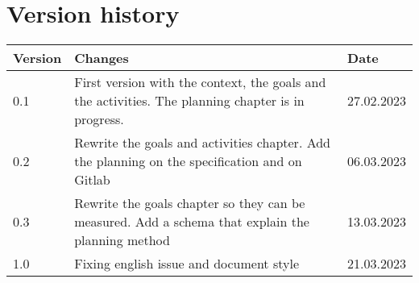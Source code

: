\chapter{Version history}
\label{chap:spec-versions}

\begin{tabular}{|m{}|m{}|m{}|}
 \hline
 \textbf{Version} & \textbf{Changes} & \textbf{Date} \\ [0.5ex]
 \hline
 0.1 & First version with the context, the goals and the activities. The planning chapter is in progress. & 27.02.2023  \\
 \hline
 0.2 & Rewrite the goals and activities chapter. Add the planning on the specification and on Gitlab & 06.03.2023  \\
 \hline
 0.3 & Rewrite the goals chapter so they can be measured. Add a schema that explain the planning method & 13.03.2023  \\
\hline
1.0 & Fixing english issue and document style & 21.03.2023  \\
\hline
\end{tabular}